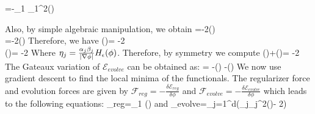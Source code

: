 \bea
{}=-\alpha_1 \beta_1^2\dirac(\phi)
\eea


Also, by simple algebraic manipulation, we obtain
\bean
{}=-2\heav(\phi) \\
=-2\heav(\phi) 
\eean
Therefore, we have 
\bea
{}\left(\right)= -2 \\
\left(\right)= -2
\eea
Where $\eta_j = \frac{\alpha_j \beta_j}{|\nabla \phi|}H_{\epsilon}(\phi)$. Therefore, by symmetry we compute 
\bea
{}\left(\right)+\left(\right)=
-2 
\eea
The Gateaux  variation of $\mathcal{E}_{evolve}$ can be obtained as:
\bea
{}= -\left(\right)
-\left(\right)
\label{app:2}
\eea
We now use gradient descent to find the local minima of the functionals. The regularizer force and evolution forces are given by $\mathcal{F}_{reg}=-\frac{\delta\mathcal{E}_{reg}}{\delta \phi}$ and $\mathcal{F}_{evolve}=-\frac{\delta\mathcal{E}_{evolve}}{\delta \phi}$ which leads to the following equations:
\bea
{}_{reg}=\nu_1  \left(\frac{\nabla \phi}{|\nabla \phi|}\right)
\eea
and
\bea
{}_{evolve}=\sum_{j=1}^{d}\left(\alpha_j\beta_j^2\dirac\left(\phi\right)- 2\right)
\eea

